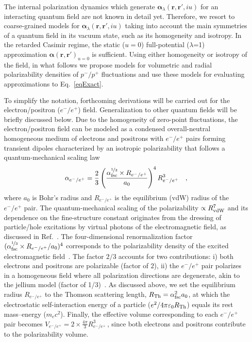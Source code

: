 \documentclass[aps,prl,twocolumn,showpacs,groupaddress]{revtex4-1}
\newcommand{\bbb}[1]{{\color{black}#1}}
\begin{document}
The internal polarization dynamics which generate ${\bm{\alpha}}_{\lambda}(\mathbf{r},\mathbf{r}',iu)$ for an interacting quantum field are not known in detail yet. Therefore, we resort to coarse-grained models for
${\bm{\alpha}}_{\lambda}(\mathbf{r},\mathbf{r}',iu)$ taking into
account the main symmetries of a quantum field in its vacuum state, such as its homogeneity and isotropy. In the retarded Casimir regime, the static ($u=0$) full-potential ($\lambda$=1) approximation
${\bm{\alpha}}(\mathbf{r},\mathbf{r}')_{u=0}$ is sufficient. Using either homogeneity or isotropy of the field, in what follows we propose models for volumetric and radial polarizability densities of $p^-/p^+$ fluctuations and use these models for evaluating approximations to Eq.~\eqref{eqExact}.

To simplify the notation, forthcoming derivations will be 
carried out for the electron/positron ($e^-/e^+$) field. Generalization to other quantum fields will be briefly discussed below. 
Due to the homogeneity of zero-point fluctuations, the electron/positron field can be modeled as a condensed overall-neutral homogeneous medium of electrons and positrons with $e^-/e^+$ pairs forming transient dipoles characterized by an isotropic polarizability that follows a quantum-mechanical scaling law~\cite{DimaPRL,alphaJPCL}
\begin{equation}
\label{eqAlphae-e+}
\alpha_{e^-/e^+} = \frac{2}{3} \left(\frac{\alpha_{\rm fsc}^{\nicefrac{1}{3}} \times R_{e^-/e^+}}{a_0}\right)^4 R_{e^-/e^+}^3 \quad ,
\end{equation}
where $a_0$ is Bohr's radius and $R_{e^-/e^+}$ is the equilibrium (vdW) radius of the $e^-/e^+$ pair. The quantum-mechanical scaling of the polarizability $\propto R_{\rm vdW}^7$ and its dependence on the fine-structure constant originates from the dressing of particle/hole excitations by virtual photons of the electromagnetic field, as discussed in Ref.~\cite{alphaJPCL}. The four-dimensional renormalization factor $(\alpha_{\rm fsc}^{\nicefrac{1}{3}} \times R_{e^-/e^+} / {a_0})^4$ corresponds to the polarizability density of the excited electromagnetic field~\cite{L4}. The factor $2/3$ accounts for two contributions: i) both electrons and positrons are polarizable (factor of $2$), ii) the $e^-/e^+$ pair polarizes in a homogeneous field where all polarization directions are degenerate, akin to the jellium model (factor of 1/3)~\cite{Nesbet}. \bbb{As discussed above,}
we set the equilibrium radius $R_{e^-/e^+}$ to the Thomson scattering length, $R_{\rm Th} = \alpha_{\rm fsc}^2 a_0$, at which the electrostatic self-interaction energy of a particle
(${e^2}/{4\pi\varepsilon_0 R_{\rm Th}}$) equals its
rest mass–energy ($m_e c^2$). Finally, the effective volume corresponding to each $e^-/e^+$ pair becomes $V_{e^-/e^+}=2 \times \frac{4 \pi}{3} R_{e^-/e^+}^3\,$, since both electrons and positrons contribute to the polarizability volume.
\end{document}
